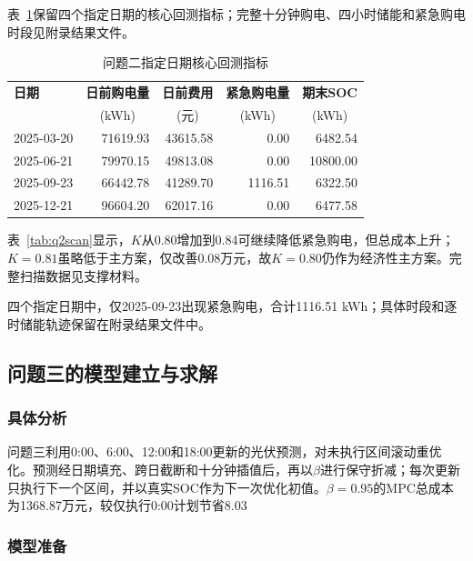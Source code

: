 \documentclass{cumcmthesis}
\begin{document}
表~\ref{tab:q2datesummary}保留四个指定日期的核心回测指标；完整十分钟购电、四小时储能和紧急购电时段见附录结果文件。

\begin{table}[H]
\centering
\normalsize
\setlength{\tabcolsep}{8pt}
\renewcommand\arraystretch{1.3}
\caption{问题二指定日期核心回测指标}
\label{tab:q2datesummary}
\begin{tabular}{lrrrr}
\toprule
\textbf{日期} & \textbf{日前购电量} & \textbf{日前费用} & \textbf{紧急购电量} & \textbf{期末SOC}\\
& \multicolumn{1}{c}{(kWh)} & \multicolumn{1}{c}{(元)} & \multicolumn{1}{c}{(kWh)} & \multicolumn{1}{c}{(kWh)}\\
\midrule
2025-03-20 & 71619.93 & 43615.58 & 0.00 & 6482.54\\
2025-06-21 & 79970.15 & 49813.08 & 0.00 & 10800.00\\
2025-09-23 & 66442.78 & 41289.70 & 1116.51 & 6322.50\\
2025-12-21 & 96604.20 & 62017.16 & 0.00 & 6477.58\\
\bottomrule
\end{tabular}
\end{table}

表~\ref{tab:q2scan}显示，$K$从0.80增加到0.84可继续降低紧急购电，但总成本上升；$K=0.81$虽略低于主方案，仅改善0.08万元，故$K=0.80$仍作为经济性主方案。完整扫描数据见支撑材料。

四个指定日期中，仅2025-09-23出现紧急购电，合计1116.51 kWh；具体时段和逐时储能轨迹保留在附录结果文件中。

\subsection{问题三的模型建立与求解}

\subsubsection{具体分析}

问题三利用0:00、6:00、12:00和18:00更新的光伏预测，对未执行区间滚动重优化。预测经日期填充、跨日截断和十分钟插值后，再以$\beta$进行保守折减；每次更新只执行下一个区间，并以真实SOC作为下一次优化初值。$\beta=0.95$的MPC总成本为1368.87万元，较仅执行0:00计划节省8.03%

\subsubsection{模型准备}
\end{document}
